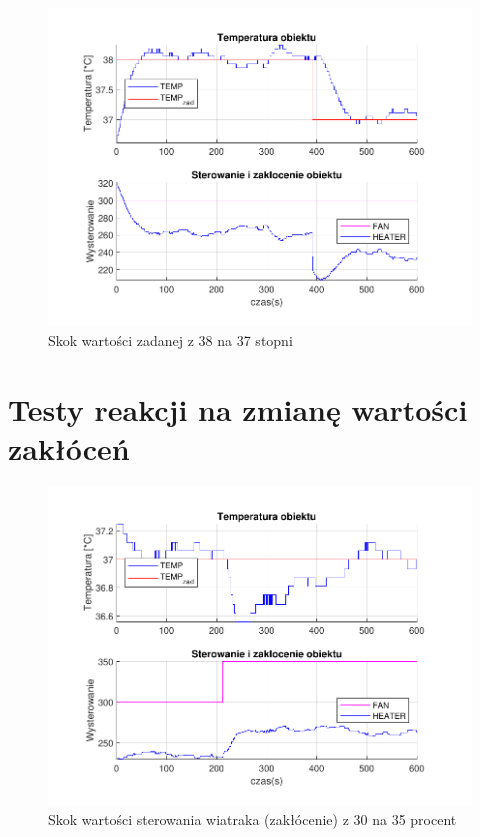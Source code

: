 \documentclass{mwrep}
\begin{document}
\begin{figure}[H]
\centering
\includegraphics[scale=0.85]{materialy/krystian_plots/3837heater.pdf}
\caption{Skok wartości zadanej z 38 na 37 stopni}
\end{figure}

\section{Testy reakcji na zmianę wartości zakłóceń}
\label{Konkurs}

\begin{figure}[H]
\centering
\includegraphics[scale=0.85]{materialy/krystian_plots/3035wiatrzakl.pdf}
\caption{Skok wartości sterowania wiatraka (zakłócenie) z 30 na 35 procent}
\end{figure}
\end{document}
